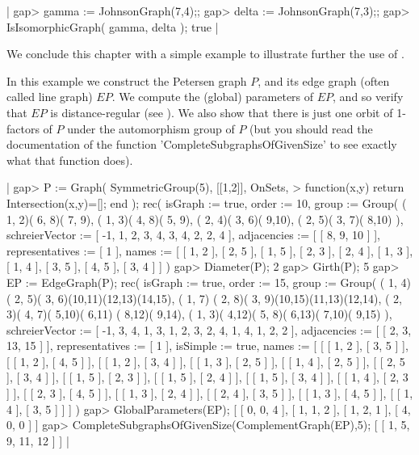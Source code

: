 |    gap> gamma := JohnsonGraph(7,4);;
    gap> delta := JohnsonGraph(7,3);;
    gap> IsIsomorphicGraph( gamma, delta );
    true |


We conclude this chapter with a simple example to  illustrate further the
use of {\GRAPE}.

In this example we construct the  Petersen graph $P$, and its  edge graph
(often  called line graph)  $EP$.  We compute  the (global) parameters of
$EP$, and so verify that $EP$ is distance-regular (see \cite{BCN89}).  We
also show that  there is just  one orbit  of 1-factors  of  $P$ under the
automorphism  group of $P$ (but you  should read the documentation of the
function 'CompleteSubgraphsOfGivenSize' to see exactly what that function
does).

|    gap> P := Graph( SymmetricGroup(5), [[1,2]], OnSets,
    >          function(x,y) return Intersection(x,y)=[]; end );
    rec(
      isGraph := true,
      order := 10,
      group := Group( ( 1, 2)( 6, 8)( 7, 9), ( 1, 3)( 4, 8)( 5, 9),
        ( 2, 4)( 3, 6)( 9,10), ( 2, 5)( 3, 7)( 8,10) ),
      schreierVector := [ -1, 1, 2, 3, 4, 3, 4, 2, 2, 4 ],
      adjacencies := [ [ 8, 9, 10 ] ],
      representatives := [ 1 ],
      names := [ [ 1, 2 ], [ 2, 5 ], [ 1, 5 ], [ 2, 3 ], [ 2, 4 ],
          [ 1, 3 ], [ 1, 4 ], [ 3, 5 ], [ 4, 5 ], [ 3, 4 ] ] )
    gap> Diameter(P);
    2
    gap> Girth(P);
    5
    gap> EP := EdgeGraph(P);
    rec(
      isGraph := true,
      order := 15,
      group := Group( ( 1, 4)( 2, 5)( 3, 6)(10,11)(12,13)(14,15), ( 1, 7)
        ( 2, 8)( 3, 9)(10,15)(11,13)(12,14), ( 2, 3)( 4, 7)( 5,10)( 6,11)
        ( 8,12)( 9,14), ( 1, 3)( 4,12)( 5, 8)( 6,13)( 7,10)( 9,15) ),
      schreierVector := [ -1, 3, 4, 1, 3, 1, 2, 3, 2, 4, 1, 4, 1, 2, 2 ],
      adjacencies := [ [ 2, 3, 13, 15 ] ],
      representatives := [ 1 ],
      isSimple := true,
      names := [ [ [ 1, 2 ], [ 3, 5 ] ], [ [ 1, 2 ], [ 4, 5 ] ],
          [ [ 1, 2 ], [ 3, 4 ] ], [ [ 1, 3 ], [ 2, 5 ] ],
          [ [ 1, 4 ], [ 2, 5 ] ], [ [ 2, 5 ], [ 3, 4 ] ],
          [ [ 1, 5 ], [ 2, 3 ] ], [ [ 1, 5 ], [ 2, 4 ] ],
          [ [ 1, 5 ], [ 3, 4 ] ], [ [ 1, 4 ], [ 2, 3 ] ],
          [ [ 2, 3 ], [ 4, 5 ] ], [ [ 1, 3 ], [ 2, 4 ] ],
          [ [ 2, 4 ], [ 3, 5 ] ], [ [ 1, 3 ], [ 4, 5 ] ],
          [ [ 1, 4 ], [ 3, 5 ] ] ] )
    gap> GlobalParameters(EP);
    [ [ 0, 0, 4 ], [ 1, 1, 2 ], [ 1, 2, 1 ], [ 4, 0, 0 ] ]
    gap> CompleteSubgraphsOfGivenSize(ComplementGraph(EP),5);
    [ [ 1, 5, 9, 11, 12 ] ] |




